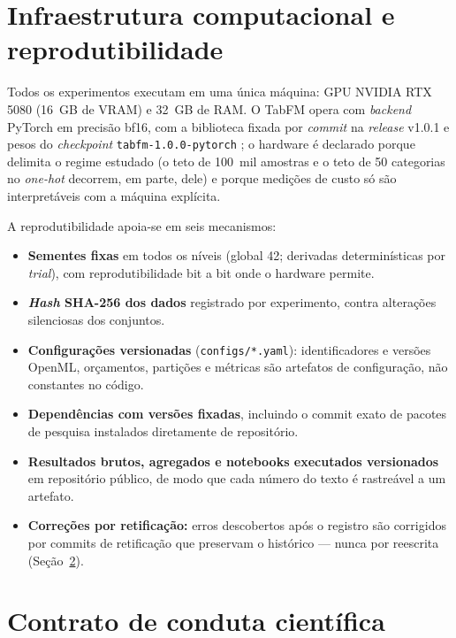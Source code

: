 \section{Infraestrutura computacional e reprodutibilidade}
\label{sec:met-reprodutibilidade}

Todos os experimentos executam em uma única máquina: GPU NVIDIA RTX 5080
(16~GB de VRAM) e 32~GB de RAM. O TabFM opera com \emph{backend} PyTorch em
precisão bf16, com a biblioteca fixada por \emph{commit} na
\emph{release} v1.0.1 e pesos do \emph{checkpoint}
\texttt{tabfm-1.0.0-pytorch} \citep{tabfm2026}; o
hardware é declarado porque delimita o regime estudado (o teto de 100~mil
amostras e o teto de 50 categorias no \emph{one-hot} decorrem, em parte,
dele) e porque medições de custo só são interpretáveis com a máquina
explícita.

A reprodutibilidade apoia-se em seis mecanismos:

\begin{itemize}
  \item \textbf{Sementes fixas} em todos os níveis (global 42; derivadas
    determinísticas por \emph{trial}), com reprodutibilidade bit a bit onde
    o hardware permite.
  \item \textbf{\emph{Hash} SHA-256 dos dados} registrado por experimento,
    contra alterações silenciosas dos conjuntos.
  \item \textbf{Configurações versionadas} (\texttt{configs/*.yaml}):
    identificadores e versões OpenML, orçamentos, partições e métricas são
    artefatos de configuração, não constantes no código.
  \item \textbf{Dependências com versões fixadas}, incluindo o commit exato
    de pacotes de pesquisa instalados diretamente de repositório.
  \item \textbf{Resultados brutos, agregados e notebooks executados
    versionados} em repositório público, de modo que cada número do texto é
    rastreável a um artefato.
  \item \textbf{Correções por retificação:} erros descobertos após o
    registro são corrigidos por commits de retificação que preservam o
    histórico --- nunca por reescrita (Seção~\ref{sec:met-conduta}).
\end{itemize}

\section{Contrato de conduta científica}
\label{sec:met-conduta}

